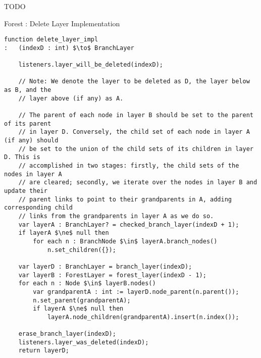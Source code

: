 TODO

\begin{stulisting}[p]
\caption{Forest : Delete Layer Implementation}
\label{code:ipfs-forest-deletelayerimpl}
\begin{lstlisting}[style=Default]
function delete_layer_impl
:	(indexD : int) $\to$ BranchLayer

	listeners.layer_will_be_deleted(indexD);

	// Note: We denote the layer to be deleted as D, the layer below as B, and the
	// layer above (if any) as A.

	// The parent of each node in layer B should be set to the parent of its parent
	// in layer D. Conversely, the child set of each node in layer A (if any) should
	// be set to the union of the child sets of its children in layer D. This is
	// accomplished in two stages: firstly, the child sets of the nodes in layer A
	// are cleared; secondly, we iterate over the nodes in layer B and update their
	// parent links to point to their grandparents in A, adding corresponding child
	// links from the grandparents in layer A as we do so.
	var layerA : BranchLayer? = checked_branch_layer(indexD + 1);
	if layerA $\ne$ null then
		for each n : BranchNode $\in$ layerA.branch_nodes()
			n.set_children({});

	var layerD : BranchLayer = branch_layer(indexD);
	var layerB : ForestLayer = forest_layer(indexD - 1);
	for each n : Node $\in$ layerB.nodes()
		var grandparentA : int := layerD.node_parent(n.parent());
		n.set_parent(grandparentA);
		if layerA $\ne$ null then
			layerA.node_children(grandparentA).insert(n.index());

	erase_branch_layer(indexD);
	listeners.layer_was_deleted(indexD);
	return layerD;

\end{lstlisting}
\end{stulisting}

